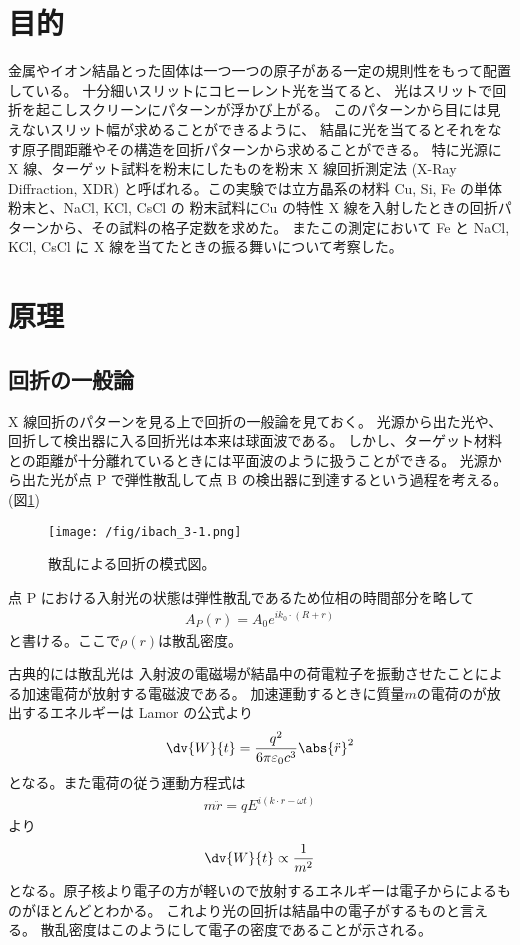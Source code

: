 \documentclass[11pt,dvipdfmx,a4paper]{jsarticle}
\begin{document}
\section{目的}
金属やイオン結晶とった固体は一つ一つの原子がある一定の規則性をもって配置している。
十分細いスリットにコヒーレント光を当てると、
光はスリットで回折を起こしスクリーンにパターンが浮かび上がる。
このパターンから目には見えないスリット幅が求めることができるように、
結晶に光を当てるとそれをなす原子間距離やその構造を回折パターンから求めることができる。
特に光源に X 線、ターゲット試料を粉末にしたものを粉末 X 線回折測定法 (X-Ray Diffraction, XDR)
と呼ばれる。この実験では立方晶系の材料 Cu, Si, Fe の単体粉末と、NaCl, KCl, CsCl の
粉末試料にCu の特性 X 線を入射したときの回折パターンから、その試料の格子定数を求めた。
またこの測定において Fe と NaCl, KCl, CsCl に X 線を当てたときの振る舞いについて考察した。

\section{原理}
\subsection{回折の一般論}
X 線回折のパターンを見る上で回折の一般論を見ておく。
光源から出た光や、回折して検出器に入る回折光は本来は球面波である。
しかし、ターゲット材料との距離が十分離れているときには平面波のように扱うことができる。
光源から出た光が点 P で弾性散乱して点 B の検出器に到達するという過程を考える。(図\ref{ibach_fig3-1})
\begin{figure}[h]
	\centering
	\texttt{[image: /fig/ibach\_3-1.png]}
	\caption{散乱による回折の模式図。\cite{ibach-luth}}
	\label{ibach_fig3-1}
\end{figure}
点 P における入射光の状態は弾性散乱であるため位相の時間部分を略して
\begin{align}
	A_P(r) = A_0e^{ik_0\cdot(R+r)}
\end{align}
と書ける。ここで\(\rho(r)\)は散乱密度。

古典的には散乱光は
入射波の電磁場が結晶中の荷電粒子を振動させたことによる加速電荷が放射する電磁波である。
加速運動するときに質量\(m\)の電荷のが放出するエネルギーは Lamor の公式より
\begin{align}
	\dv{W}{t} = \frac{q^2}{6\pi\varepsilon_0c^3}\abs{\ddot{r}}^2
\end{align}
となる。また電荷の従う運動方程式は
\begin{align}
	m\ddot{r} = qE^{i(k\cdot r -\omega t)}
\end{align}
より
\begin{align}
	\dv{W}{t} \propto \frac{1}{m^2}
\end{align}
となる。原子核より電子の方が軽いので放射するエネルギーは電子からによるものがほとんどとわかる。
これより光の回折は結晶中の電子がするものと言える。
散乱密度はこのようにして電子の密度であることが示される。
\end{document}
